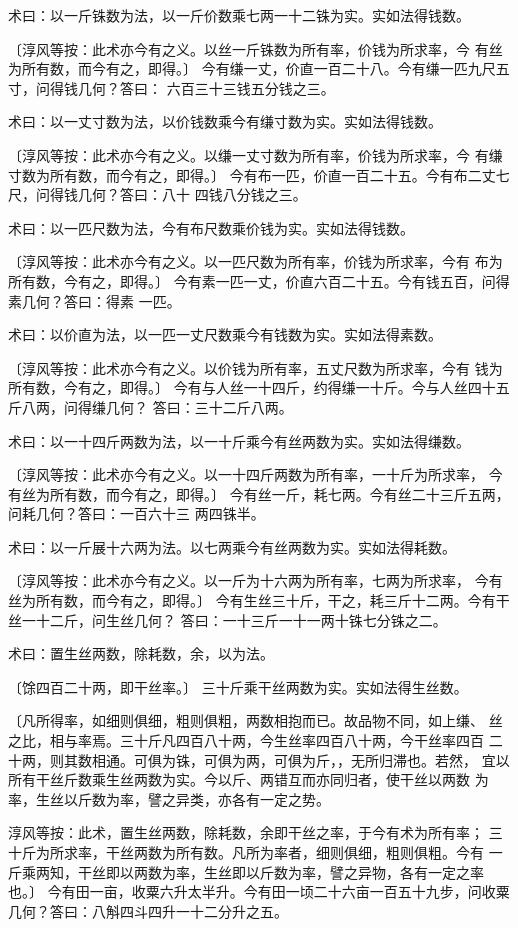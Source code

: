 \documentclass[12pt,UTF8]{ctexbook}
\begin{document}
术曰：以一斤铢数为法，以一斤价数乘七两一十二铢为实。实如法得钱数。

〔淳风等按：此术亦今有之义。以丝一斤铢数为所有率，价钱为所求率，今 有丝为所有数，而今有之，即得。〕 今有缣一丈，价直一百二十八。今有缣一匹九尺五寸，问得钱几何？答曰： 六百三十三钱五分钱之三。

术曰：以一丈寸数为法，以价钱数乘今有缣寸数为实。实如法得钱数。

〔淳风等按：此术亦今有之义。以缣一丈寸数为所有率，价钱为所求率，今 有缣寸数为所有数，而今有之，即得。〕 今有布一匹，价直一百二十五。今有布二丈七尺，问得钱几何？答曰：八十 四钱八分钱之三。

术曰：以一匹尺数为法，今有布尺数乘价钱为实。实如法得钱数。

〔淳风等按：此术亦今有之义。以一匹尺数为所有率，价钱为所求率，今有 布为所有数，今有之，即得。〕 今有素一匹一丈，价直六百二十五。今有钱五百，问得素几何？答曰：得素 一匹。

术曰：以价直为法，以一匹一丈尺数乘今有钱数为实。实如法得素数。

〔淳风等按：此术亦今有之义。以价钱为所有率，五丈尺数为所求率，今有 钱为所有数，今有之，即得。〕 今有与人丝一十四斤，约得缣一十斤。今与人丝四十五斤八两，问得缣几何？ 答曰：三十二斤八两。

术曰：以一十四斤两数为法，以一十斤乘今有丝两数为实。实如法得缣数。

〔淳风等按：此术亦今有之义。以一十四斤两数为所有率，一十斤为所求率， 今有丝为所有数，而今有之，即得。〕 今有丝一斤，耗七两。今有丝二十三斤五两，问耗几何？答曰：一百六十三 两四铢半。

术曰：以一斤展十六两为法。以七两乘今有丝两数为实。实如法得耗数。

〔淳风等按：此术亦今有之义。以一斤为十六两为所有率，七两为所求率， 今有丝为所有数，而今有之，即得。〕 今有生丝三十斤，干之，耗三斤十二两。今有干丝一十二斤，问生丝几何？ 答曰：一十三斤一十一两十铢七分铢之二。

术曰：置生丝两数，除耗数，余，以为法。

〔馀四百二十两，即干丝率。〕 三十斤乘干丝两数为实。实如法得生丝数。

〔凡所得率，如细则俱细，粗则俱粗，两数相抱而已。故品物不同，如上缣、 丝之比，相与率焉。三十斤凡四百八十两，今生丝率四百八十两，今干丝率四百 二十两，则其数相通。可俱为铢，可俱为两，可俱为斤，，无所归滞也。若然， 宜以所有干丝斤数乘生丝两数为实。今以斤、两错互而亦同归者，使干丝以两数 为率，生丝以斤数为率，譬之异类，亦各有一定之势。

淳风等按：此术，置生丝两数，除耗数，余即干丝之率，于今有术为所有率； 三十斤为所求率，干丝两数为所有数。凡所为率者，细则俱细，粗则俱粗。今有 一斤乘两知，干丝即以两数为率，生丝即以斤数为率，譬之异物，各有一定之率 也。〕 今有田一亩，收粟六升太半升。今有田一顷二十六亩一百五十九步，问收粟 几何？答曰：八斛四斗四升一十二分升之五。
\end{document}
